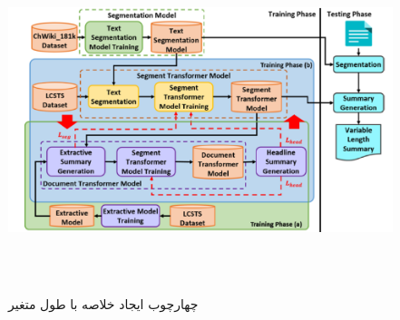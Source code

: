 





\begin{figure}[!h]
	\begin{center}
		\includegraphics[height=10cm]{two-stage model.png}
	\end{center}
	\caption{ چهارچوب ایجاد خلاصه با طول متغیر \cite{twostage}}
	\label{fig:two_stage_model}
	\medskip
	\small	
\end{figure}





